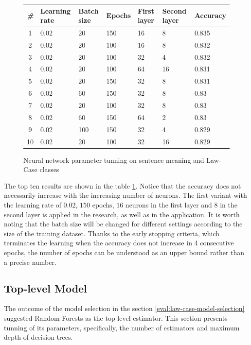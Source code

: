 \documentclass[
  digital, %
  notable,   %
  nolof,     %
  nolot,     %
]{fithesis3}
\begin{document}
\begin{figure}[H]
\centering
\caption{Neural network parameter tunning on sentence meaning and Law-Case classes}
\label{fig:gridsearch}
\begin{tabularx}{\textwidth}{|c|X|X|X|X|X||X|}
\hline
\rowcolor{gray!30}
\textit{\#} & \textbf{Learning rate} & \textbf{Batch size} & \textbf{Epochs} & \textbf{First layer} &  \textbf{Second layer} & \textbf{Accuracy}  \\ \hline
1 & 0.02 & 20 & 150 & 16 & 8 & 0.835  \\ \hline
2 & 0.02 & 20 & 100 & 16 & 8 & 0.832\\ \hline
3 & 0.02 & 20 & 100 & 32 & 4 & 0.832\\ \hline
4 & 0.02 & 20 & 100 & 64 & 16 & 0.831\\ \hline
5 & 0.02 & 20 & 150 & 32 & 8 & 0.831\\ \hline
6 & 0.02 & 60 & 150 & 32 & 8 & 0.83\\ \hline
7 & 0.02 & 20 & 100 & 32 & 8 & 0.83\\ \hline
8 & 0.02 & 60 & 150 & 64 & 2 & 0.83\\ \hline
9 & 0.02 & 100 & 150 & 32 & 4 & 0.829\\ \hline
10 & 0.02 & 20 & 100 & 32 & 16 & 0.829\\ \hline
\end{tabularx}
\end{figure}

The top ten results are shown in the table \ref{fig:gridsearch}.
Notice that the accuracy does not necessarily increase with the increasing number of neurons.
The first variant with the learning rate of $0.02$, $150$ epochs, $16$ neurons in the first layer and $8$ in the second layer is applied in the research, as well as in the application.
It is worth noting that the batch size will be changed for different settings according to the size of the training dataset.
Thanks to the early stopping criteria, which terminates the learning when the accuracy does not increase in 4 consecutive epochs, the number of epochs can be understood as an upper bound rather than a precise number.

\subsection{Top-level Model}
\label{eval:law-case-model-tuning}
The outcome of the model selection in the section \ref{eval:law-case-model-selection} suggested Random Forests as the top-level estimator.
This section presents tunning of its parameters, specifically, the number of estimators and maximum depth of decision trees.
\end{document}
